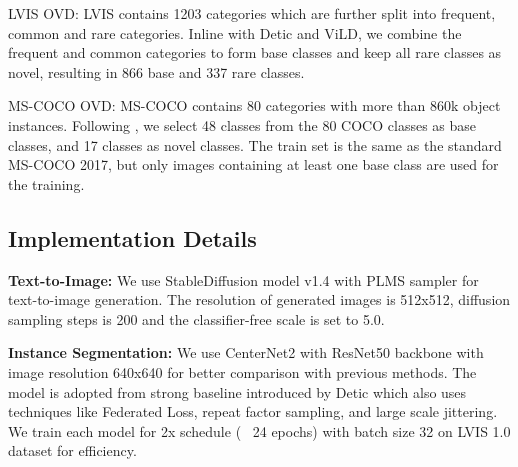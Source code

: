 \documentclass{article}
\begin{document}
\iffalse
LVIS OVD: LVIS contains 1203 categories which are further split into frequent, common and rare
categories. Inline with Detic and ViLD, we combine the frequent and common categories to form base classes
and keep all rare classes as novel, resulting in 866 base and 337 rare classes.

MS-COCO OVD: MS-COCO contains 80 categories with more than 860k object instances. Following \cite{ovr-cnn}, we select 48 classes from the 80 COCO classes as base classes, and 17 classes as novel classes. The train set  is the same as the standard MS-COCO 2017, but only images containing at least one base class are used for the training.

\begin{table}[h]
  \small
  \centering
\vspace{-2mm}
\caption{A summary of dataset statistics. The numbers in bracket refer to the number of base and novel categories.}
\vspace{-4mm}
\label{tab:datasets}
\end{table}

\subsection{Implementation Details}

\textbf{Text-to-Image:} We use StableDiffusion model v1.4 with PLMS sampler for text-to-image generation. The resolution of generated images is 512x512, diffusion sampling steps is 200 and the classifier-free scale is set to 5.0.

\textbf{Instance Segmentation:}  We use CenterNet2 with ResNet50 backbone with image resolution 640x640 for better comparison with previous methods. The model is adopted from strong baseline introduced by Detic \cite{Detic} which also uses techniques like Federated Loss, repeat factor sampling, and large scale jittering. We train each model for 2x schedule (~ 24 epochs) with batch size 32 on LVIS 1.0 dataset for efficiency. 
\end{document}
